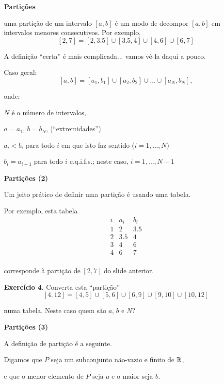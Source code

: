 \documentclass[oneside,12pt]{article}
\begin{document}
\newpage

{\bf Partições}

 uma partição de um intervalo $[a,b]$ é um
modo de decompor $[a,b]$ em intervalos menores consecutivos. Por
exemplo, 
%
$$[2,7] = [2,3.5]∪[3.5,4]∪[4,6]∪[6,7]$$

A definição ``certa'' é mais complicada... vamos vê-la daqui a pouco.

Caso geral:
%
$$[a,b] = [a_1,b_1]∪[a_2,b_2]∪\ldots∪[a_N,b_N],$$

onde:

$N$ é o número de intervalos,

$a=a_1$, $b=b_N$, (``extremidades'')

$a_i<b_i$ para todo $i$ em que isto faz sentido ($i=1,\ldots,N$)

$b_i=a_{i+1}$ para todo $i$ e.q.i.f.s.; neste caso, $i=1,\ldots,N-1$

\newpage


{\bf Partições (2)}

Um jeito prático de definir uma partição é usando uma tabela.

Por exemplo, esta tabela
%
$$\begin{array}{ccc}
  i & a_i & b_i \\\hline
  1 & 2 & 3.5 \\
  2 & 3.5 & 4 \\
  3 & 4 & 6 \\
  4 & 6 & 7 \\
  \end{array}
$$

corresponde à partição de $[2,7]$ do slide anterior.

{\bf Exercício 4.} Converta esta ``partição''
%
$$[4,12] = [4,5]∪[5,6]∪[6,9]∪[9,10]∪[10,12]$$

numa tabela. Neste caso quem são $a$, $b$ e $N$?

\newpage


{\bf Partições (3)}

A definição  de partição é a seguinte.

Digamos que $P$ seja um subconjunto não-vazio e finito de $\mathbb{R}$,

e que o menor elemento de $P$ seja $a$ e o maior seja $b$.
\end{document}
